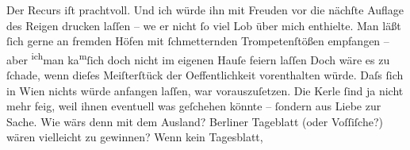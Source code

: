 \pstart
           Der Recurs iſt prachtvoll. Und ich würde ihn mit Freuden vor die nächſte {\pb}Auflage des Reigen drucken laſſen – we{\geminationn} er nicht{ }ſo viel Lob über mich enthielte. Man läßt{ }ſich gerne an fremden Höfen mit{ }ſchmetternden Trompetenſtößen empfangen – aber \substVorne{}\textsuperscript{ich}\substDazwischen{}man\substHinten{} ka{\geminationn}\substVorne{}\textsuperscript{m}\substDazwischen{}ſ\substHinten{}ich doch nicht im eigenen Hauſe feiern laſſen{\dotstwo}
               Doch wäre es zu{ }ſchade, wenn dieſes Meiſterſtück der Oeffentlichkeit vorenthalten
               würde. Daſs{ }ſich in Wien nichts würde anfangen
               laſſen, war vorauszuſetzen. Die Kerle{ }ſind ja nicht mehr feig, weil ihnen even{\pb}tuell was geſchehen
               könnte –{ }ſondern aus Liebe zur Sache. Wie wärs denn mit dem Ausland? Berliner Tageblatt (oder Voſſiſche?) wären vielleicht zu gewinnen? Wenn kein Tagesblatt,
